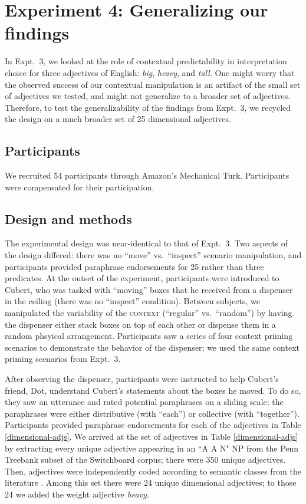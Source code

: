 \documentclass[preprint,12pt,authoryear,titlepage]{elsarticle}
\begin{document}
\section{Experiment 4: Generalizing our findings}

In Expt.~3, we looked at the role of contextual predictability in interpretation choice for three adjectives of English: \emph{big}, \emph{heavy}, and \emph{tall}. One might worry that the observed success of our contextual manipulation is an artifact of the small set of adjectives we %
tested, and might not generalize to a broader set of adjectives. Therefore, to test the generalizability of the findings from Expt.~3, we recycled the design on a much broader set of 25 dimensional adjectives.

\subsection{Participants}

We recruited 54 participants through Amazon's Mechanical Turk. Participants were compensated for their participation.

\subsection{Design and methods}

The experimental design was near-identical to that of Expt.~3. Two aspects of the design differed: there was no ``move'' vs.~``inspect'' scenario manipulation, and participants provided paraphrase endorsements for 25 rather than three predicates. At the outset of the experiment, participants were introduced to Cubert, who was tasked with ``moving'' boxes that he received from a dispenser in the ceiling (there was no ``inspect'' condition). Between subjects, we manipulated the variability of the \textsc{context} (``regular'' vs.~``random'') by having the dispenser either stack boxes on top of each other or dispense them in a random phsyical arrangement. Participants saw a series of four context priming scenarios to demonstrate the behavior of the dispenser; we used the same context priming scenarios from Expt.~3.

After observing the dispenser, participants were instructed to help Cubert's friend, Dot, understand Cubert's statements about the boxes he moved. To do so, they saw an utterance and rated potential paraphrases on a sliding scale; the paraphrases were either distributive (with ``each'') or collective (with ``together''). Participants provided paraphrase endorsements for each of the adjectives in Table \ref{dimensional-adjs}. We arrived at the set of adjectives in Table \ref{dimensional-adjs} by extracting every unique adjective appearing in an ``A A N" NP from the Penn Treebank subset of the Switchboard corpus; there were 350 unique adjectives. Then, adjectives were independently coded according to semantic classes from the literature \citep[e.g.,][]{dixon1982}. Among this set there were 24 unique dimensional adjectives; to those 24 we added the weight adjective \emph{heavy}.
\end{document}
